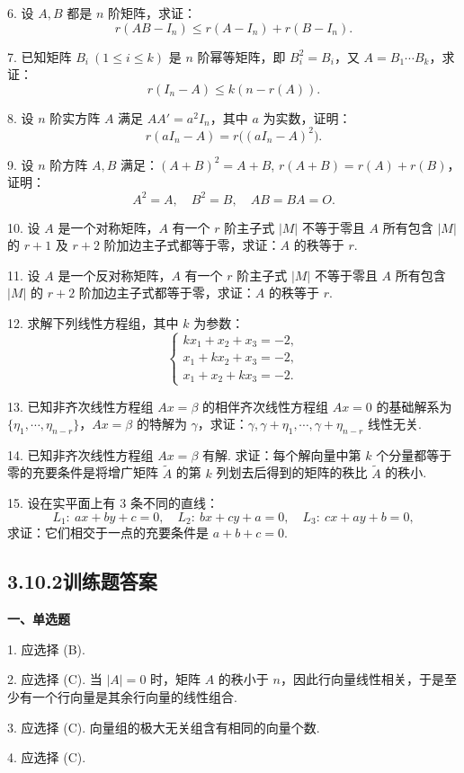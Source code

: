 \documentclass[UTF8,12pt,a4paper,fontset=fandol]{ctexart}
\begin{document}
6. 设 $A,B$ 都是 $n$ 阶矩阵，求证：
\[
r(AB-I_n)\le r(A-I_n)+r(B-I_n).
\]

7. 已知矩阵 $B_i\ (1\le i\le k)$ 是 $n$ 阶幂等矩阵，即 $B_i^2=B_i$，又 $A=B_1\cdots B_k$，求证：
\[
r(I_n-A)\le k(n-r(A)).
\]

8. 设 $n$ 阶实方阵 $A$ 满足 $AA'=a^2I_n$，其中 $a$ 为实数，证明：
\[
r(aI_n-A)=r\bigl((aI_n-A)^2\bigr).
\]

9. 设 $n$ 阶方阵 $A,B$ 满足：$(A+B)^2=A+B$, $r(A+B)=r(A)+r(B)$，证明：
\[
A^2=A,\quad B^2=B,\quad AB=BA=O.
\]

10. 设 $A$ 是一个对称矩阵，$A$ 有一个 $r$ 阶主子式 $|M|$ 不等于零且 $A$ 所有包含 $|M|$ 的 $r+1$ 及 $r+2$ 阶加边主子式都等于零，求证：$A$ 的秩等于 $r$.

11. 设 $A$ 是一个反对称矩阵，$A$ 有一个 $r$ 阶主子式 $|M|$ 不等于零且 $A$ 所有包含 $|M|$ 的 $r+2$ 阶加边主子式都等于零，求证：$A$ 的秩等于 $r$.

12. 求解下列线性方程组，其中 $k$ 为参数：
\[
\begin{cases}
kx_1+x_2+x_3=-2,\\
x_1+kx_2+x_3=-2,\\
x_1+x_2+kx_3=-2.
\end{cases}
\]

13. 已知非齐次线性方程组 $Ax=\beta$ 的相伴齐次线性方程组 $Ax=0$ 的基础解系为 $\{\eta_1,\cdots,\eta_{n-r}\}$，$Ax=\beta$ 的特解为 $\gamma$，求证：$\gamma,\gamma+\eta_1,\cdots,\gamma+\eta_{n-r}$ 线性无关.

14. 已知非齐次线性方程组 $Ax=\beta$ 有解. 求证：每个解向量中第 $k$ 个分量都等于零的充要条件是将增广矩阵 $\widetilde{A}$ 的第 $k$ 列划去后得到的矩阵的秩比 $\widetilde{A}$ 的秩小.

15. 设在实平面上有 3 条不同的直线：
\[
L_1:\ ax+by+c=0,\quad
L_2:\ bx+cy+a=0,\quad
L_3:\ cx+ay+b=0,
\]
求证：它们相交于一点的充要条件是 $a+b+c=0$.

\subsection*{3.10.2\quad 训练题答案}

\noindent\textbf{一、单选题}

1. 应选择 (B).

2. 应选择 (C). 当 $|A|=0$ 时，矩阵 $A$ 的秩小于 $n$，因此行向量线性相关，于是至少有一个行向量是其余行向量的线性组合.

3. 应选择 (C). 向量组的极大无关组含有相同的向量个数.

4. 应选择 (C).
\end{document}
